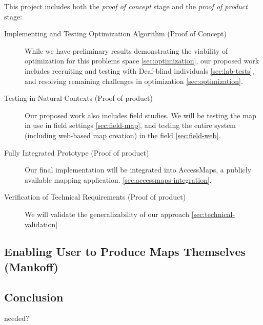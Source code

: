 This project includes both the \textit{proof of concept} stage and the \textit{proof of product} stage:
\begin{description}
\item[Implementing and Testing Optimization Algorithm (Proof of Concept)] While we have preliminary results demonstrating the viability of optimization for this problems space \ref{sec:optimization}, our proposed work includes recruiting and testing with Deaf-blind individuals \ref{sec:lab-tests}, and resolving remaining challenges in optimization \ref{sec:optimization}.
\item[Testing in Natural Contexts (Proof of product)] Our proposed work also includes field studies. We will be testing the map in use in field settings \ref{sec:field-map}, and testing the entire system (including web-based map creation) in the field \ref{sec:field-web}. 
\item[Fully Integrated Prototype (Proof of product)]
Our final implementation will be integrated into AccessMaps, a publicly available mapping application. \ref{sec:accessmaps-integration}.
\item[Verification of Technical Requirements (Proof of product)]
We will validate the generalizability of our approach  \ref{sec:technical-validation}
\end{description}
    

\subsection{Enabling User to Produce Maps Themselves (Mankoff)}


\subsection{Conclusion}
needed?